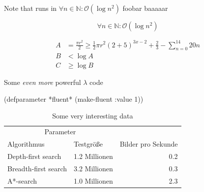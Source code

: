 \documentclass{thesis}
\begin{document}
Note that  runs\cite{patrick_rothfuss_name_2012} in \( \forall n \in \mathbb{N}: \mathcal{O}(\log n^2) \) foobar\cite{patrick_rothfuss_furcht_2011} baaaaar\cite{patrick_rothfuss_furcht_2012}

\[
\forall n \in \mathbb{N}: \mathcal{O}(\log n^2)
\]

\begin{align}
  A & = \frac{\pi r^2}{2} \geq \frac{1}{2} \pi r^2 (2 + 5)^{3x - 2} + \frac{2}{3} - \sum_{n=0}^{14}{20n}\\
  B & < \log A\\
  C & \geq \log B
\end{align}

\blindtext

\begin{listing}
  \caption{Some \emph{even more} powerful $\lambda$ code}
  \begin{lispcode}
(defparameter *fluent* (make-fluent :value 1))
  \end{lispcode}
\end{listing}

\blindtext

\begin{table}
  \caption{Some very interesting data}
  \center
  \begin{tabular}{l l r}
  \toprule
  \multicolumn{2}{c}{Parameter}\\
  \cmidrule{1-2}
  Algorithmus & Testgröße & Bilder pro Sekunde\\
  \midrule
  Depth-first search & 1.2 Millionen & 0.2\\
  \addlinespace
  Breadth-first search & 3.2 Millionen & 0.3\\
  \addlinespace
  A*-search & 1.0 Millionen & 2.3\\
  \bottomrule
  \end{tabular}
\end{table}

\Blinddocument
\end{document}
